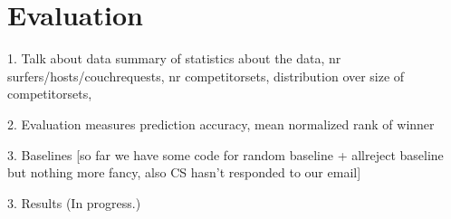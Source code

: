 \section{Evaluation} \label{sec:evaluation}
 
1. Talk about data
summary of statistics about the data, nr surfers/hosts/couchrequests, nr competitorsets, distribution over size of competitorsets, 

2. Evaluation measures
prediction accuracy, mean normalized rank of winner

3. Baselines
[so far we have some code for random baseline + allreject baseline but nothing more fancy, also CS hasn't responded to our email]

3. Results
(In progress.)
